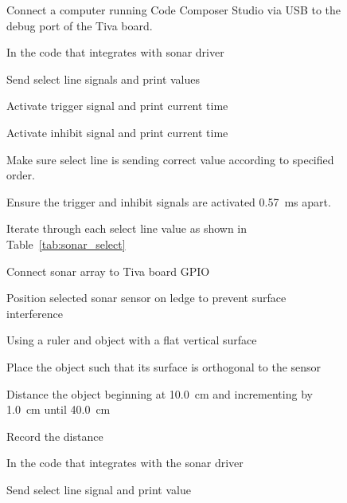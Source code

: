 \documentclass{article}
\begin{document}
    \begin{figure}[htb]
        \centering
        \begin{framed}
        \begin{enumerate*}
            \item Connect a computer running Code Composer Studio
            via USB to the debug port of the Tiva board.
            \item In the code that integrates with sonar driver
            \begin{enumerate*}
                \item Send select line signals and print values
                \item Activate trigger signal and print current time
                \item Activate inhibit signal and print current time
                \item Make sure select line is sending correct value
                according to specified order.
                \item Ensure the trigger and inhibit signals
                are activated \SI{0.57}{\milli\second} apart.
                \item Iterate through each select line value
                as shown in Table~\ref{tab:sonar_select}
            \end{enumerate*}
            \item Connect sonar array to Tiva board GPIO
            \item Position selected sonar sensor on ledge
            to prevent surface interference
            \item Using a ruler and object with a flat vertical surface
            \begin{enumerate*}
                \item Place the object such that its surface is orthogonal
                to the sensor
                \item Distance the object beginning at \SI{10.0}{\centi\meter}
                and incrementing by \SI{1.0}{\centi\meter} until
                \SI{40.0}{\centi\meter}
                \item Record the distance
            \end{enumerate*}
            \item In the code that integrates with the sonar driver
            \begin{enumerate*}
                \item Send select line signal and print value

\end{enumerate*}
\end{enumerate*}
\end{framed}
\end{figure}
\end{document}
